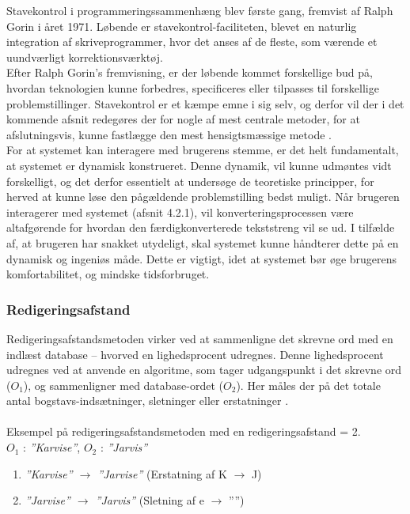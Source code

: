 \label{sec:stavekontrol}
Stavekontrol i programmeringssammenhæng blev første gang, fremvist af Ralph Gorin i året 1971. Løbende er stavekontrol-faciliteten, blevet en naturlig integration af skriveprogrammer, hvor det anses af de fleste, som værende et uundværligt korrektionsværktøj. \\ Efter Ralph Gorin’s fremvisning, er der løbende kommet forskellige bud på, hvordan teknologien kunne forbedres, specificeres eller tilpasses til forskellige problemstillinger. Stavekontrol er et kæmpe emne i sig selv, og derfor vil der i det kommende afsnit redegøres der for nogle af mest centrale metoder, for at afslutningsvis, kunne fastlægge den mest hensigtsmæssige metode \cite{UnifiedSpellCheck}.\\

For at systemet kan interagere med brugerens stemme, er det helt fundamentalt, at systemet er dynamisk konstrueret. Denne dynamik, vil kunne udmøntes vidt forskelligt, og det derfor essentielt at undersøge de teoretiske principper, for herved at kunne løse den pågældende problemstilling bedst muligt. Når brugeren interagerer med systemet (afsnit 4.2.1), vil konverteringsprocessen være altafgørende for hvordan den færdigkonverterede tekststreng vil se ud. I tilfælde af, at brugeren har snakket utydeligt, skal systemet kunne håndterer dette på en dynamisk og ingeniøs måde. Dette er vigtigt, idet at systemet bør øge brugerens komfortabilitet, og mindske tidsforbruget. \\

\subsubsection{Redigeringsafstand} %
Redigeringsafstandsmetoden virker ved at sammenligne det skrevne ord med en indlæst database – hvorved en lighedsprocent udregnes. Denne lighedsprocent udregnes ved at anvende en algoritme, som tager udgangspunkt i det skrevne ord ($O_1$), og sammenligner med database-ordet ($O_2$). Her måles der på det totale antal bogstavs-indsætninger, sletninger eller erstatninger \cite{UnifiedSpellCheck}. \\\\
Eksempel på redigeringsafstandsmetoden med en redigeringsafstand = 2. \\ $O_1$ : \textit{”Karvise”}, $O_2$ : \textit{”Jarvis”}
\begin{enumerate}
    \item \textit{”Karvise” $\rightarrow$ ”Jarvise”} (Erstatning af K $\rightarrow$ J)
    \item \textit{”Jarvise” $\rightarrow$ ”Jarvis”} (Sletning af e $\rightarrow$ ””)
\end{enumerate}

